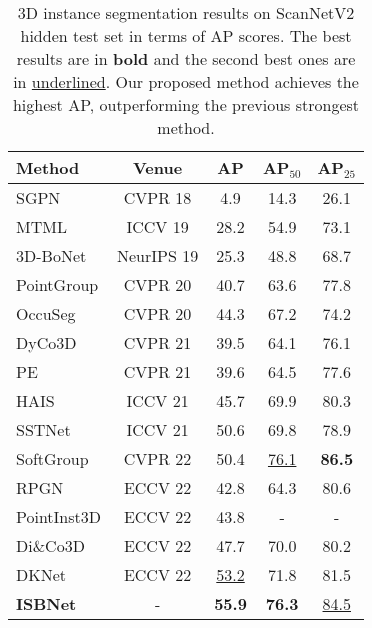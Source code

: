 \documentclass[10pt,twocolumn,letterpaper]{article}
\def\Approach{ISBNet}
\begin{document}
\begin{table}
\small
\setlength{\tabcolsep}{8pt}
\centering
\begin{tabular}{lcccc}
\toprule
\textbf{Method} & \textbf{Venue} & \textbf{AP} & \textbf{AP$_{50}$} & \textbf{AP$_{25}$}  \\ 
\midrule
SGPN \cite{wang2018sgpn} & CVPR 18 & 4.9 & 14.3 & 26.1 \\
MTML \cite{yang2019learning} & ICCV 19 & 28.2 & 54.9 & 73.1 \\
3D-BoNet \cite{yang2019learning} & NeurIPS 19 & 25.3 & 48.8 & 68.7 \\
PointGroup \cite{jiang2020pointgroup} & CVPR 20 & 40.7 & 63.6 & 77.8 \\
OccuSeg \cite{han2020occuseg} & CVPR 20 & 44.3 & 67.2 & 74.2 \\
DyCo3D \cite{he2021dyco3d} & CVPR 21 & 39.5 & 64.1 & 76.1 \\
PE \cite{zhang2021point} & CVPR 21 & 39.6 & 64.5 & 77.6 \\
HAIS \cite{chen2021hierarchical} & ICCV 21 & 45.7 & 69.9 & 80.3 \\ 
SSTNet \cite{liang2021instance} & ICCV 21 & 50.6 & 69.8 & 78.9 \\
SoftGroup \cite{vu2022softgroup} & CVPR 22 & 50.4 & \underline{76.1} & \textbf{86.5} \\
RPGN \cite{dong2022rpgn} & ECCV 22 & 42.8 & 64.3 & 80.6 \\
PointInst3D \cite{He2022PointInst3DS3} & ECCV 22 & 43.8 & - & - \\
Di\&Co3D \cite{zhao2022divide} & ECCV 22 & 47.7 & 70.0 & 80.2 \\
DKNet \cite{wu2022dknet} & ECCV 22 & \underline{53.2} & 71.8 & 81.5 \\
\midrule
\textbf{\Approach} &  - & \textbf{55.9} & \textbf{76.3} & \underline{84.5} \\ 
\bottomrule
\end{tabular}
\vspace{-4pt}
\caption{3D instance segmentation results on ScanNetV2 hidden test set in terms of AP scores. The best results are in \textbf{bold} and the second best ones are in \underline{underlined}. Our proposed method achieves the highest AP, outperforming the previous strongest method.}
\label{tab:scannet_test}
\vspace{-16pt}
\end{table}
\end{document}
